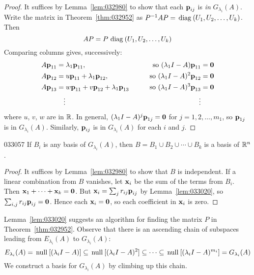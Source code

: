 \begin{proof}
It suffices by Lemma~\ref{lem:032980} to show that each $\textbf{p}_{ij}$ is \textit{in} $G_{\lambda_i}(A)$. Write the matrix in Theorem~\ref{thm:032952} as $P^{-1}AP = \thinspace\operatorname{diag\medspace}(U_{1}, U_{2}, \dots, U_{k})$. Then
\begin{equation*}
AP = P \thinspace\operatorname{diag\medspace}(U_1, U_2, \dots, U_k)
\end{equation*}
Comparing columns gives, successively:
\begin{alignat*}{2}
A\textbf{p}_{11} &= \lambda_{1}\textbf{p}_{11}, & \quad\quad \mbox{so } (\lambda_{1}I - A)\textbf{p}_{11} &= \textbf{0} \\
A\textbf{p}_{12} &= u\textbf{p}_{11} + \lambda_{1}\textbf{p}_{12}, & \quad\quad \mbox{so } (\lambda_{1}I - A)^2\textbf{p}_{12} &= \textbf{0} \\
A\textbf{p}_{13} &= w\textbf{p}_{11} + v\textbf{p}_{12} + \lambda_{1}\textbf{p}_{13} & \quad\quad \mbox{so } (\lambda_{1}I - A)^3\textbf{p}_{13} &= \textbf{0} \\
& \quad \vdots & \vdots &
\end{alignat*}
where $u$, $v$, $w$ are in $\mathbb{R}$. In general, $(\lambda_{1}I - A)^{j}\textbf{p}_{1j} = \textbf{0}$ for $j = 1, 2, \dots, m_{1}$, so $\textbf{p}_{1j}$ is in $G_{\lambda_i}(A)$. Similarly, $\textbf{p}_{ij}$ is in $G_{\lambda_i}(A)$ for each $i$ and $j$.
\end{proof}

\begin{lemma}{}{033057}
If $B_{i}$ is any basis of $G_{\lambda_i}(A)$, then $B = B_{1} \cup B_{2} \cup \cdots \cup B_{k}$ is a basis of $\mathbb{R}^n$.
\end{lemma}

\begin{proof}
It suffices by Lemma~\ref{lem:032980} to show that $B$ is independent. If a linear combination from $B$ vanishes, let $\textbf{x}_{i}$ be the sum of the terms from $B_{i}$. Then $\textbf{x}_{1} + \cdots + \textbf{x}_{k} = \textbf{0}$. But $\textbf{x}_{i} = \sum_{j} r_{ij}\textbf{p}_{ij}$ by Lemma~\ref{lem:033020}, so $\sum_{i,j} r_{ij}\textbf{p}_{ij} = \textbf{0}$. Hence each $\textbf{x}_{i} = \textbf{0}$, so each coefficient in $\textbf{x}_{i}$ is zero.
\end{proof}

Lemma~\ref{lem:033020} suggests an algorithm for finding the matrix $P$ in Theorem~\ref{thm:032952}. Observe that there is an ascending chain of subspaces leading from $E_{\lambda_i}(A)$ to $G_{\lambda_i}(A)$:
\begin{equation*}
E_{\lambda_i}(A) = \thinspace\operatorname{null\medspace}[(\lambda_{i}I - A)] \subseteq \thinspace\operatorname{null\medspace}[(\lambda_{i}I - A)^2] \subseteq \cdots \subseteq \thinspace\operatorname{null\medspace}[(\lambda_{i}I - A)^{m_{i}}] = G_{\lambda_i}(A)
\end{equation*}
We construct a basis for $G_{\lambda_i}(A)$ by climbing up this chain.


